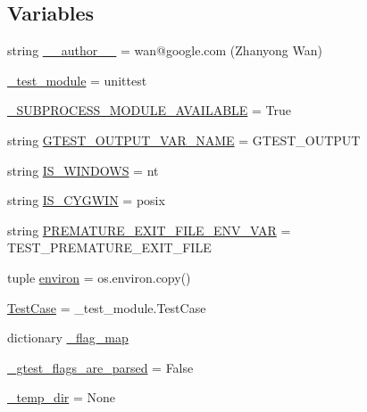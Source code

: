 \subsection*{Variables}
\begin{DoxyCompactItemize}
\item 
string \hyperlink{namespacegtest__test__utils_a221c8f3baa0a26c6158106b76d51e9ce}{\+\_\+\+\_\+author\+\_\+\+\_\+} = \textquotesingle{}wan@google.\+com (Zhanyong Wan)\textquotesingle{}
\item 
\hyperlink{namespacegtest__test__utils_aa19abf2658f4160d2fcb6ce94d16612c}{\+\_\+test\+\_\+module} = unittest
\item 
\hyperlink{namespacegtest__test__utils_af29139d2934cf1c6da2af020a399c36e}{\+\_\+\+S\+U\+B\+P\+R\+O\+C\+E\+S\+S\+\_\+\+M\+O\+D\+U\+L\+E\+\_\+\+A\+V\+A\+I\+L\+A\+B\+L\+E} = True
\item 
string \hyperlink{namespacegtest__test__utils_aeb3755b4dd33aabe1baee781fecc1e66}{G\+T\+E\+S\+T\+\_\+\+O\+U\+T\+P\+U\+T\+\_\+\+V\+A\+R\+\_\+\+N\+A\+M\+E} = \textquotesingle{}G\+T\+E\+S\+T\+\_\+\+O\+U\+T\+P\+U\+T\textquotesingle{}
\item 
string \hyperlink{namespacegtest__test__utils_a7555b17006f1c078cda336750b8613e0}{I\+S\+\_\+\+W\+I\+N\+D\+O\+W\+S} = \textquotesingle{}nt\textquotesingle{}
\item 
string \hyperlink{namespacegtest__test__utils_a6a936096debb3c2e807d000f76245740}{I\+S\+\_\+\+C\+Y\+G\+W\+I\+N} = \textquotesingle{}posix\textquotesingle{}
\item 
string \hyperlink{namespacegtest__test__utils_aa961c38a16224b2e7fd8c93fc1d2a90f}{P\+R\+E\+M\+A\+T\+U\+R\+E\+\_\+\+E\+X\+I\+T\+\_\+\+F\+I\+L\+E\+\_\+\+E\+N\+V\+\_\+\+V\+A\+R} = \textquotesingle{}T\+E\+S\+T\+\_\+\+P\+R\+E\+M\+A\+T\+U\+R\+E\+\_\+\+E\+X\+I\+T\+\_\+\+F\+I\+L\+E\textquotesingle{}
\item 
tuple \hyperlink{namespacegtest__test__utils_abe5d1d27c225592317b5bda5b4309471}{environ} = os.\+environ.\+copy()
\item 
\hyperlink{namespacegtest__test__utils_acb97a85206c09d233db6c7f2362e5428}{Test\+Case} = \+\_\+test\+\_\+module.\+Test\+Case
\item 
dictionary \hyperlink{namespacegtest__test__utils_a2493ee5c4436cfb8b6746e3da0a5d9a1}{\+\_\+flag\+\_\+map}
\item 
\hyperlink{namespacegtest__test__utils_a123ea2b70f6aaf7849d58e68b87a8131}{\+\_\+gtest\+\_\+flags\+\_\+are\+\_\+parsed} = False
\item 
\hyperlink{namespacegtest__test__utils_a63e521665d381cdeddd27066f11bdbbf}{\+\_\+temp\+\_\+dir} = None
\end{DoxyCompactItemize}


